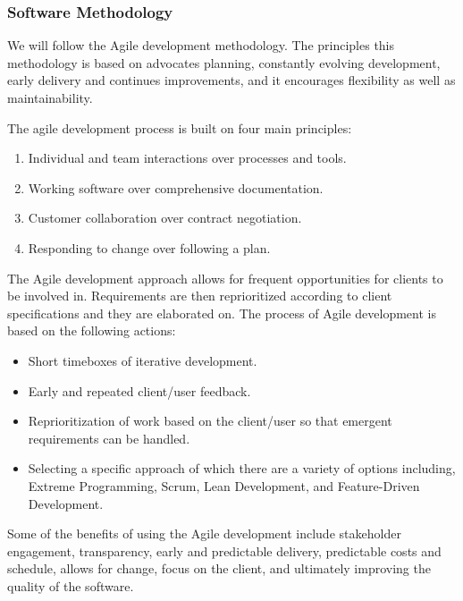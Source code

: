 	\subsubsection{Software Methodology}
	We will follow the Agile development methodology. The principles this methodology is based on advocates planning, constantly evolving development, early delivery and continues improvements, and it encourages flexibility as well as maintainability.

	\begin{flushleft}
	The agile development process is built on four main principles:
		\begin{enumerate}
			\item Individual and team interactions over processes and tools.
			\item Working software over comprehensive documentation.
			\item Customer collaboration over contract negotiation.
			\item Responding to change over following a plan.
		\end{enumerate}
	\end{flushleft}

\begin{flushleft}

The Agile development approach allows for frequent opportunities for clients to be involved in. Requirements are then reprioritized according to client specifications and they are elaborated on. The process of Agile development is based on the following actions:

\end{flushleft}

    \begin{itemize}
			\item Short timeboxes of iterative development.
			\item Early and repeated client/user feedback.
			\item Reprioritization of work based on the client/user so that emergent requirements can be handled.
			\item Selecting a specific approach of which there are a variety of options including, Extreme Programming, Scrum, Lean Development, and Feature-Driven Development.
		\end{itemize}

Some of the benefits of using the Agile development include stakeholder engagement, transparency, early and predictable delivery, predictable costs and schedule, allows for change, focus on the client, and ultimately improving the quality of the software.

